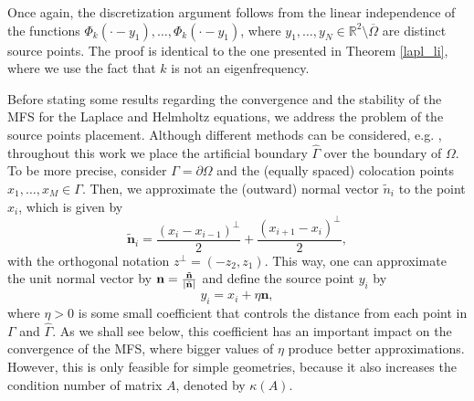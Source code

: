 Once again, the discretization argument follows from the linear independence of the functions \(\Phi_k(\cdot-y_1),\dots,\Phi_k(\cdot-y_1)\), where \(y_1,\dots,y_N \in \mathbb{R}^2\setminus\overline{\Omega}\) are distinct source points. The proof is identical to the one presented in Theorem \ref{lapl_li}, where we use the fact that \(k\) is not an eigenfrequency.

Before stating some results regarding the convergence and the stability of the \ac{MFS} for the Laplace and Helmholtz equations, we address the problem of the source points placement. Although different methods can be considered, e.g. \cite{alves2009choice}, throughout this work we place the artificial boundary \(\hat{\Gamma}\) over the boundary of \(\Omega\). To be more precise, consider \(\Gamma = \partial \Omega\) and the (equally spaced) colocation points \(x_1,\dots,x_M \in \Gamma\). Then, we approximate the (outward) normal vector \(\tilde{n}_i\) to the point \(x_i\), which is given by
\[
    \tilde{\mathbf{n}}_i = \frac{(x_i - x_{i-1})^\perp }{2} + \frac{(x_{i+1}-x_i)^\perp }{2},
\]
with the orthogonal notation \(z^\perp = (-z_2,z_1)\). This way, one can approximate the unit normal vector by \(\mathbf{n} = \frac{\tilde{\mathbf{n}}}{\abs{\tilde{\mathbf{n}}}}\) and define the source point \(y_i\) by
\[
    y_i = x_i + \eta \mathbf{n},
\]
where \(\eta>0\) is some small coefficient that controls the distance from each point in \(\Gamma\) and \(\hat{\Gamma}\). As we shall see below, this coefficient has an important impact on the convergence of the \ac{MFS}, where bigger values of \(\eta\) produce better approximations. However, this is only feasible for simple geometries, because it also increases the condition number of matrix \(A\), denoted by \(\kappa(A)\).

